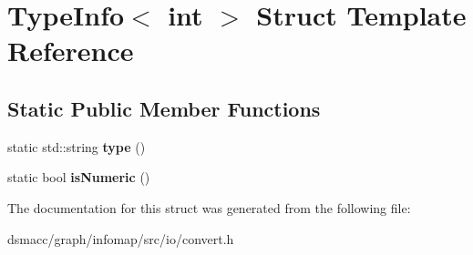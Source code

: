 \hypertarget{structTypeInfo_3_01int_01_4}{}\section{Type\+Info$<$ int $>$ Struct Template Reference}
\label{structTypeInfo_3_01int_01_4}
\subsection*{Static Public Member Functions}
\begin{DoxyCompactItemize}
\item 
\mbox{\label{structTypeInfo_3_01int_01_4_aa5ac53d6f2b5c975462c296ba13142e6}} 
static std\+::string {\bfseries type} ()
\item 
\mbox{\label{structTypeInfo_3_01int_01_4_a9a71804bfcb458fe88056efce944d62b}} 
static bool {\bfseries is\+Numeric} ()
\end{DoxyCompactItemize}


The documentation for this struct was generated from the following file\+:\begin{DoxyCompactItemize}
\item 
dsmacc/graph/infomap/src/io/convert.\+h\end{DoxyCompactItemize}
